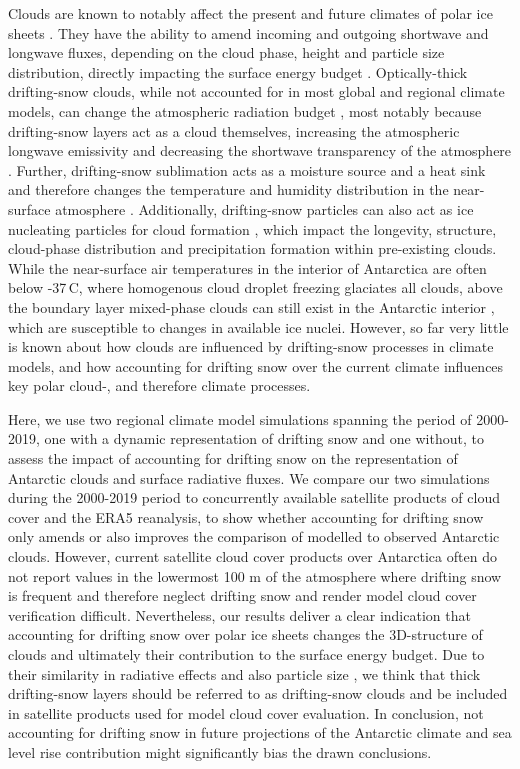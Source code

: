 \documentclass[draft]{agujournal2019}
\begin{document}
Clouds are known to notably affect the present and future climates of polar ice sheets \cite{Gilbert2020,Gorodetskaya2015,Lachlan2010,Hofer2017, Hofer2019,Hahn2019}. They have the ability to amend incoming and outgoing shortwave and longwave fluxes, depending on the cloud phase, height and particle size distribution, directly impacting the surface energy budget \cite{Gilbert2020,Tan2016,Tan2019}. Optically-thick drifting-snow clouds, while not accounted for in most global and regional climate models, can change the atmospheric radiation budget \cite{Letoumelin2020}, most notably because drifting-snow layers act as a cloud themselves, increasing the atmospheric longwave emissivity and decreasing the shortwave transparency of the atmosphere \cite{Yang2013, Yamanouchi1984, Letoumelin2020, Lawson2006}. Further, drifting-snow sublimation acts as a moisture source and a heat sink and therefore changes the temperature and humidity distribution in the near-surface atmosphere \cite{Amory2019}. Additionally, drifting-snow particles can also act as ice nucleating particles for cloud formation \cite{Geerts2015}, which impact the longevity, structure, cloud-phase distribution and precipitation formation within pre-existing clouds. While the near-surface air temperatures in the interior of Antarctica are often below -37\,\textdegree C, where homogenous cloud droplet freezing glaciates all clouds, above the boundary layer mixed-phase clouds can still exist in the Antarctic interior \cite{Lawson2014}, which are susceptible to changes in available ice nuclei. However, so far very little is known about how clouds are influenced by drifting-snow processes in climate models, and how accounting for drifting snow over the current climate influences key polar cloud-, and therefore climate processes.

Here, we use two regional climate model simulations spanning the period of 2000-2019, one with a dynamic representation of drifting snow and one without, to assess the impact of accounting for drifting snow on the representation of Antarctic clouds and surface radiative fluxes. We compare our two simulations during the 2000-2019 period to concurrently available satellite products of cloud cover and the ERA5 reanalysis, to show whether accounting for drifting snow only amends or also improves the comparison of modelled to observed Antarctic clouds. However, current satellite cloud cover products over Antarctica often do not report values in the lowermost 100 m  of the atmosphere where drifting snow is frequent and therefore neglect drifting snow and render model cloud cover verification difficult. Nevertheless, our results deliver a clear indication that accounting for drifting snow over polar ice sheets changes the 3D-structure of clouds and ultimately their contribution to the surface energy budget. Due to their similarity in radiative effects and also particle size \cite{Lawson2006}, we think that thick drifting-snow layers should be referred to as drifting-snow clouds and be included in satellite products used for model cloud cover evaluation. In conclusion, not accounting for drifting snow in future projections of the Antarctic climate and sea level rise contribution might significantly bias the drawn conclusions.
\end{document}

